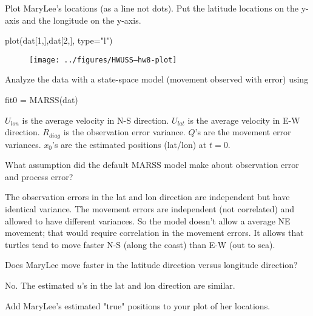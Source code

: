 \begin{wideenumerate}
\item Plot MaryLee's locations (as a line not dots).  Put the latitude locations on the y-axis and the longitude on the y-axis. 

\begin{Schunk}
\begin{Sinput}
 plot(dat[1,],dat[2,], type="l")
\end{Sinput}
\end{Schunk}

\begin{figure}[htp]
\begin{center}
\texttt{[image: ../figures/HWUSS--hw8-plot]}
\end{center}
\end{figure}

\item Analyze the data with a state-space model (movement observed with error) using

\begin{Schunk}
\begin{Sinput}
 fit0 = MARSS(dat)
\end{Sinput}
\end{Schunk}

$U_{lon}$ is the average velocity in N-S direction. $U_{lat}$ is the average velocity in E-W direction. $R_{diag}$ is the observation error variance. $Q$'s are the movement error variances. $x_0$'s are the estimated positions (lat/lon) at $t=0$.

\item What assumption did the default MARSS model make about observation error and process error?

The observation errors in the lat and lon direction are independent but have identical variance.  The movement errors are independent (not correlated) and allowed to have different variances.  So the model doesn't allow a average NE movement; that would require correlation in the movement errors.  It allows that turtles tend to move faster N-S (along the coast) than E-W (out to sea).

\item Does MaryLee move faster in the latitude direction versus longitude direction?

No. The estimated $u$'s in the lat and lon direction are similar.

\item Add MaryLee's estimated "true" positions to your plot of her locations. 


\end{wideenumerate}
